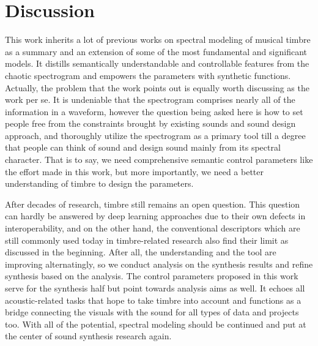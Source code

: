 \documentclass{article}
\begin{document}
\section{Discussion}
This work inherits a lot of previous works on spectral modeling of musical timbre as a summary and an extension of some of the most fundamental and significant models. It distills semantically understandable and controllable features from the chaotic spectrogram and empowers the parameters with synthetic functions. Actually, the problem that the work points out is equally worth discussing as the work per se. It is undeniable that the spectrogram comprises nearly all of the information in a waveform, however the question being asked here is how to set people free from the constraints brought by existing sounds and sound design approach, and thoroughly utilize the spectrogram as a primary tool till a degree that people can think of sound and design sound mainly from its spectral character. That is to say, we need comprehensive semantic control parameters like the effort made in this work, but more importantly, we need a better understanding of timbre to design the parameters. 

After decades of research, timbre still remains an open question. This question can hardly be answered by deep learning approaches due to their own defects in interoperability, and on the other hand, the conventional descriptors which are still commonly used today in timbre-related research also find their limit as discussed in the beginning. After all, the understanding and the tool are improving alternatingly, so we conduct analysis on the synthesis results and refine synthesis based on the analysis. The control parameters proposed in this work serve for the synthesis half but point towards analysis aims as well. It echoes all acoustic-related tasks that hope to take timbre into account and functions as a bridge connecting the visuals with the sound for all types of data and projects too. With all of the potential, spectral modeling should be continued and put at the center of sound synthesis research again.

\end{document}

